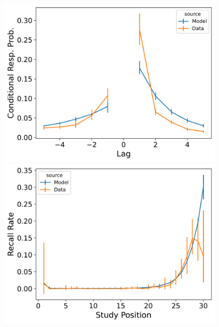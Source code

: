 \documentclass[
  letterpaper,
  11pt,
  english,
  singlespacing,
  headsepline]{MastersDoctoralThesis}
\begin{document}
\begin{figure}
\begin{minipage}{0.33\linewidth}
\includegraphics{icmr_figures/Murdock1962_TraceScalingCMR_Model_Fitting_LL30_crp-1.png}\end{minipage}%
%
\begin{minipage}{0.33\linewidth}
\includegraphics{icmr_figures/Murdock1962_TraceScalingCMR_Model_Fitting_LL30_pnr-1.png}\end{minipage}%
%
\begin{minipage}{0.33\linewidth}

\end{minipage}
\end{figure}
\end{document}
